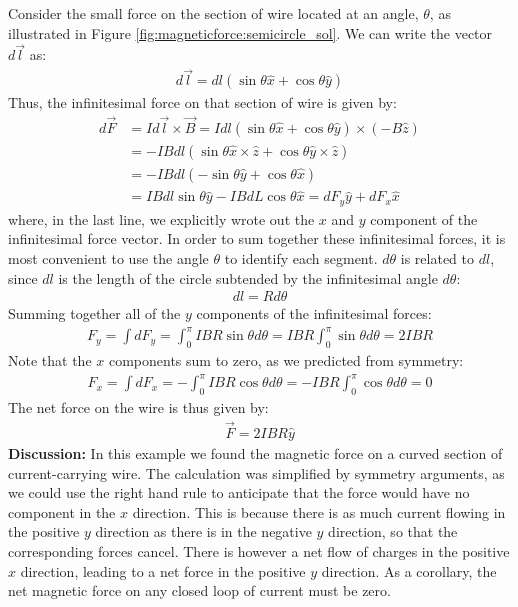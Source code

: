 \begin{example}
Consider the small force on the section of wire located at an angle, $\theta$, as illustrated in Figure \ref{fig:magneticforce:semicircle_sol}. We can write the vector $d\vec l$ as:
\begin{align*}
d\vec l = dl(\sin\theta\hat x + \cos\theta \hat y)
\end{align*}
Thus, the infinitesimal force on that section of wire is given by:
\begin{align*}
d\vec F &= I d\vec l \times \vec B = I dl(\sin\theta\hat x + \cos\theta \hat y)\times (-B\hat z)\\
&=-IBdl (\sin\theta\hat x \times \hat z + \cos\theta \hat y \times \hat z)\\
&=-IBdl (-\sin\theta \hat y + \cos\theta\hat x) \\
&= IBdl\sin\theta \hat y - IBdL\cos\theta \hat x = dF_y\hat y + dF_x \hat x
\end{align*} 
where, in the last line, we explicitly wrote out the $x$ and $y$ component of the infinitesimal force vector. In order to sum together these infinitesimal forces, it is most convenient to use the angle $\theta$ to identify each segment. $d\theta$ is related to $dl$, since $dl$ is the length of the circle subtended by the infinitesimal angle $d\theta$:
\begin{align*}
dl = Rd\theta
\end{align*}
Summing together all of the $y$ components of the infinitesimal forces:
\begin{align*}
F_y = \int dF_y = \int_0^\pi IBR\sin\theta d\theta=IBR \int_0^\pi\sin\theta d\theta=2IBR
\end{align*}
Note that the $x$ components sum to zero, as we predicted from symmetry:
\begin{align*}
F_x = \int dF_x = -\int_0^\pi IBR\cos\theta d\theta=-IBR \int_0^\pi\cos\theta d\theta=0
\end{align*}
The net force on the wire is thus given by:
\begin{align*}
\vec F = 2IBR\hat y
\end{align*}
\textbf{Discussion: }In this example we found the magnetic force on a curved section of current-carrying wire. The calculation was simplified by symmetry arguments, as we could use the right hand rule to anticipate that the force would have no component in the $x$ direction. This is because there is as much current flowing in the positive $y$ direction as there is in the negative $y$ direction, so that the corresponding forces cancel. There is however a net flow of charges in the positive $x$ direction, leading to a net force in the positive $y$ direction. As a corollary, the net magnetic force on any closed loop of current must be zero.
\end{example}
